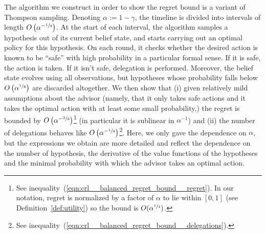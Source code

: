 \documentclass[anon,12pt]{colt2018} %
\newcommand{\Comment}[1]{}
\newcommand{\AP}[1]{\left(#1\right)}
\begin{document}
The algorithm we construct in order to show the regret bound is a variant of Thompson sampling. Denoting $\alpha:=1-\gamma$, the timeline is divided into intervals of length $O\AP{\alpha^{-\sfrac{1}{4}}}$. At the start of each interval, the algorithm samples a hypothesis out of its current belief state, and starts carrying out an optimal policy for this hypothesis. On each round, it checks whether the desired action is known to be \enquote{safe} with high probability in a particular formal sense. If it is safe, the action is taken. If it isn't safe, delegation is performed. Moreover, the belief state evolves using all observations, but hypotheses whose probability falls below $O\AP{\alpha^{\sfrac{1}{4}}}$ are discarded altogether. We then show that (i) given relatively mild assumptions about the advisor (namely, that it only takes safe actions and it takes the optimal action with at least some small probability,) the regret is bounded by $O\AP{\alpha^{-\sfrac{3}{4}}}$\footnote{See inequality~(\ref{eqn:crl__balanced_regret_bound__regret}). In our notation, regret is normalized by a factor of $\alpha$ to lie within $[0,1]$ (see Definition~\ref{def:utility}) so the bound is $O(\alpha^{\sfrac{1}{4}})$.} (in particular it is sublinear in $\alpha^{-1}$) and (ii) the number of delegations behaves like $O\AP{\alpha^{-\sfrac{1}{4}}}$\footnote{See inequality~(\ref{eqn:crl__balanced_regret_bound__delegations}).}. Here, we only gave the dependence on $\alpha$, but the expressions we obtain are more detailed and reflect the dependence on the number of hypothesis, the derivative of the value functions of the hypotheses and the minimal probability with which the advisor takes an optimal action.

\Comment{The proof is based on the conjunction of four observations. The first is that, with high probability, our algorithm only takes safe actions (since it delegates whenever it is uncertain.) The second is that the number of delegations cannot be large for the \emph{information theoretic} reason that, delegation is only done under conditions in which it is expected to yield a certain minimal \emph{information gain}, whereas, since the number of hypotheses is some finite $N$, the total amount of information is also finite and equal to $\ln N$. The third is that, assuming all actions are safe, regret can be approximated by \enquote{episodic regret} (to show this we use the Taylor expansion of the value of states in the parameter $\alpha$.) The fourth is that Thompson sampling (without delegation) satisfies an upper bound on episode regret in terms of the information gain due to observing the reward during this episode (the intuition is, if observing the reward yields no information, then the optimal policy for any hypothesis is optimal for all other hypotheses, so there is no regret,) and the sum of information gains over episodes is again bounded by $\ln N$. Here, both information theoretic steps require the assumption that no hypothesis is assigned a very small but positive probability, which necessitates discarding such hypothesis. This \enquote{distortion} of the belief state has little effect because, obviously, hypotheses with very small probability are likely to be false.}
\end{document}
